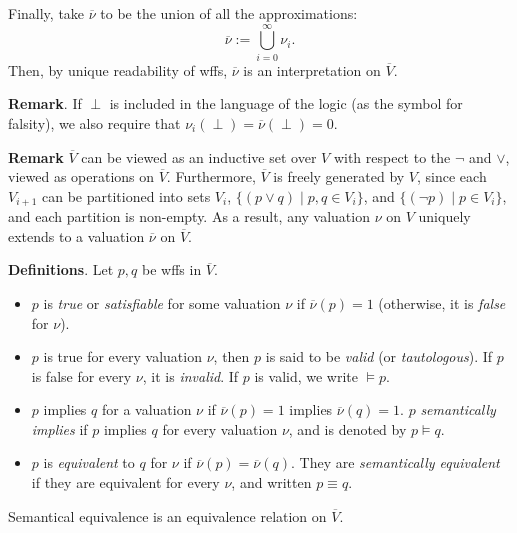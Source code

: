 \documentclass[12pt]{article}
\begin{document}
Finally, take $\overline{\nu}$ to be the union of all the approximations: $$\overline{\nu}:=\bigcup_{i=0}^{\infty} \nu_i.$$  Then, by unique readability of wffs, $\overline{\nu}$ is an interpretation on $\overline{V}$.

\textbf{Remark}.  If $\perp$ is included in the language of the logic (as the symbol for falsity), we also require that $\nu_i(\perp)=\overline{\nu}(\perp)=0$.

\textbf{Remark} $\overline{V}$ can be viewed as an inductive set over $V$ with respect to the $\neg$ and $\vee$, viewed as operations on $\overline{V}$.  Furthermore, $\overline{V}$ is freely generated by $V$, since each $V_{i+1}$ can be partitioned into sets $V_i$,  $\lbrace (p \vee q) \mid p,q \in V_i\rbrace$, and $\lbrace (\neg p) \mid p\in V_i\rbrace$, and each partition is non-empty.  As a result, any valuation $\nu$ on $V$ uniquely extends to a valuation $\overline{\nu}$ on $\overline{V}$.

\textbf{Definitions}.  Let $p,q$ be wffs in $\overline{V}$.
\begin{itemize}
\item $p$ is \emph{true} or \emph{satisfiable} for some valuation $\nu$ if $\overline{\nu}(p)=1$ (otherwise, it is \emph{false} for $\nu$).
\item $p$ is true for every valuation $\nu$, then $p$ is said to be \emph{valid} (or \emph{tautologous}).  If $p$ is false for every $\nu$, it is \emph{invalid}.  If $p$ is valid, we write $\models p$.
\item $p$ implies $q$ for a valuation $\nu$ if $\overline{\nu}(p)=1$ implies $\overline{\nu}(q)=1$.  $p$ \emph{semantically implies} if $p$ implies $q$ for every valuation $\nu$, and is denoted by $p \models q$.
\item $p$ is \emph{equivalent} to $q$ for $\nu$ if $\overline{\nu}(p)=\overline{\nu}(q)$.  They are \emph{semantically equivalent} if they are equivalent for every $\nu$, and written $p\equiv q$.
\end{itemize}

Semantical equivalence is an equivalence relation on $\overline{V}$.
\end{document}
